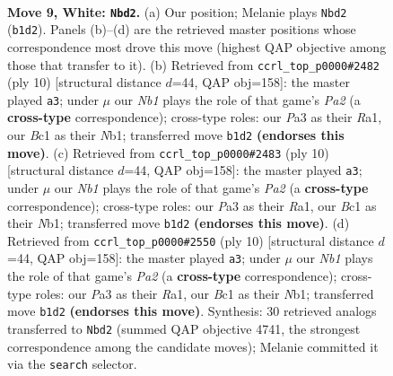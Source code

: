 \documentclass[11pt]{article}
\begin{document}
\clearpage

\begin{figure}[p]\centering
\begin{subfigure}{0.46\textwidth}\centering
\resizebox{\linewidth}{!}{%
\newchessgame
\chessboard[
  setfen={r3kbnr/pp1b1p2/1qn1p3/2ppP1pp/3P4/P1P2N2/1P3PPP/RNBQKB1R w Kkq - 0 9},
  showmover=false,
  pgfstyle=straightmove, color=movearrow, markmove={b1-d2}
]}
\caption{}
\end{subfigure}\hfill
\begin{subfigure}{0.46\textwidth}\centering
\resizebox{\linewidth}{!}{%
\newchessgame
\chessboard[
  setfen={r1b1kbnr/pp3ppp/1qn1p3/2ppP3/3P4/2P2N2/PP3PPP/RNBQKB1R w KQkq - 3 6},
  showmover=false,
  pgfstyle=straightmove, color=movearrow, markmove={a2-a3}
]}
\caption{}
\end{subfigure}
\\[4pt]
\begin{subfigure}{0.46\textwidth}\centering
\resizebox{\linewidth}{!}{%
\newchessgame
\chessboard[
  setfen={r1b1kbnr/pp3ppp/1qn1p3/2ppP3/3P4/2P2N2/PP3PPP/RNBQKB1R w KQkq - 3 6},
  showmover=false,
  pgfstyle=straightmove, color=movearrow, markmove={a2-a3}
]}
\caption{}
\end{subfigure}\hfill
\begin{subfigure}{0.46\textwidth}\centering
\resizebox{\linewidth}{!}{%
\newchessgame
\chessboard[
  setfen={r1b1kbnr/pp3ppp/1qn1p3/2ppP3/3P4/2P2N2/PP3PPP/RNBQKB1R w KQkq - 3 6},
  showmover=false,
  pgfstyle=straightmove, color=movearrow, markmove={a2-a3}
]}
\caption{}
\end{subfigure}
\caption{\textbf{Move 9, White: \texttt{Nbd2}.} (a) Our position; Melanie plays \texttt{Nbd2} (\texttt{b1d2}). Panels (b)--(d) are the retrieved master positions whose correspondence most drove this move (highest QAP objective among those that transfer to it). (b) Retrieved from \texttt{ccrl\_top\_p0000\#2482} (ply 10) [structural distance $d$=44, QAP obj=158]: the master played \texttt{a3}; under $\mu$ our \emph{Nb1} plays the role of that game's \emph{Pa2} (a \textbf{cross-type} correspondence); cross-type roles: our \emph{P}a3 as their \emph{R}a1, our \emph{B}c1 as their \emph{N}b1; transferred move \texttt{b1d2} \textbf{(endorses this move)}. (c) Retrieved from \texttt{ccrl\_top\_p0000\#2483} (ply 10) [structural distance $d$=44, QAP obj=158]: the master played \texttt{a3}; under $\mu$ our \emph{Nb1} plays the role of that game's \emph{Pa2} (a \textbf{cross-type} correspondence); cross-type roles: our \emph{P}a3 as their \emph{R}a1, our \emph{B}c1 as their \emph{N}b1; transferred move \texttt{b1d2} \textbf{(endorses this move)}. (d) Retrieved from \texttt{ccrl\_top\_p0000\#2550} (ply 10) [structural distance $d$=44, QAP obj=158]: the master played \texttt{a3}; under $\mu$ our \emph{Nb1} plays the role of that game's \emph{Pa2} (a \textbf{cross-type} correspondence); cross-type roles: our \emph{P}a3 as their \emph{R}a1, our \emph{B}c1 as their \emph{N}b1; transferred move \texttt{b1d2} \textbf{(endorses this move)}. Synthesis: 30 retrieved analogs transferred to \texttt{Nbd2} (summed QAP objective 4741, the strongest correspondence among the candidate moves); Melanie committed it via the \texttt{search} selector.}

\end{figure}
\end{document}
